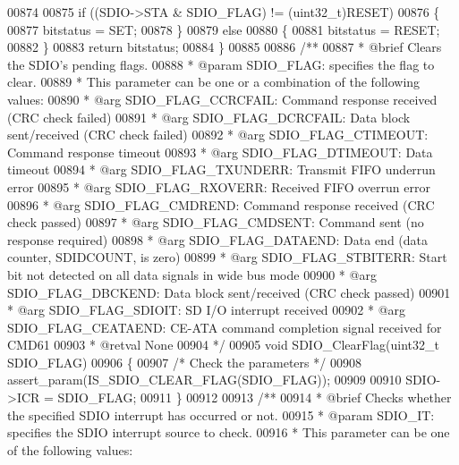 \begin{DoxyCode}
00874 
00875   \textcolor{keywordflow}{if} ((SDIO->STA & SDIO\_FLAG) != (uint32\_t)RESET)
00876   \{
00877     bitstatus = SET;
00878   \}
00879   \textcolor{keywordflow}{else}
00880   \{
00881     bitstatus = RESET;
00882   \}
00883   \textcolor{keywordflow}{return} bitstatus;
00884 \}
00885 
00886 \textcolor{comment}{/**}
00887 \textcolor{comment}{  * @brief  Clears the SDIO's pending flags.}
00888 \textcolor{comment}{  * @param  SDIO\_FLAG: specifies the flag to clear.  }
00889 \textcolor{comment}{  *          This parameter can be one or a combination of the following values:}
00890 \textcolor{comment}{  *            @arg SDIO\_FLAG\_CCRCFAIL: Command response received (CRC check failed)}
00891 \textcolor{comment}{  *            @arg SDIO\_FLAG\_DCRCFAIL: Data block sent/received (CRC check failed)}
00892 \textcolor{comment}{  *            @arg SDIO\_FLAG\_CTIMEOUT: Command response timeout}
00893 \textcolor{comment}{  *            @arg SDIO\_FLAG\_DTIMEOUT: Data timeout}
00894 \textcolor{comment}{  *            @arg SDIO\_FLAG\_TXUNDERR: Transmit FIFO underrun error}
00895 \textcolor{comment}{  *            @arg SDIO\_FLAG\_RXOVERR:  Received FIFO overrun error}
00896 \textcolor{comment}{  *            @arg SDIO\_FLAG\_CMDREND:  Command response received (CRC check passed)}
00897 \textcolor{comment}{  *            @arg SDIO\_FLAG\_CMDSENT:  Command sent (no response required)}
00898 \textcolor{comment}{  *            @arg SDIO\_FLAG\_DATAEND:  Data end (data counter, SDIDCOUNT, is zero)}
00899 \textcolor{comment}{  *            @arg SDIO\_FLAG\_STBITERR: Start bit not detected on all data signals in wide bus mode}
00900 \textcolor{comment}{  *            @arg SDIO\_FLAG\_DBCKEND:  Data block sent/received (CRC check passed)}
00901 \textcolor{comment}{  *            @arg SDIO\_FLAG\_SDIOIT:   SD I/O interrupt received}
00902 \textcolor{comment}{  *            @arg SDIO\_FLAG\_CEATAEND: CE-ATA command completion signal received for CMD61}
00903 \textcolor{comment}{  * @retval None}
00904 \textcolor{comment}{  */}
00905 \textcolor{keywordtype}{void} SDIO_ClearFlag(uint32\_t SDIO\_FLAG)
00906 \{
00907   \textcolor{comment}{/* Check the parameters */}
00908   assert_param(IS\_SDIO\_CLEAR\_FLAG(SDIO\_FLAG));
00909 
00910   SDIO->ICR = SDIO\_FLAG;
00911 \}
00912 
00913 \textcolor{comment}{/**}
00914 \textcolor{comment}{  * @brief  Checks whether the specified SDIO interrupt has occurred or not.}
00915 \textcolor{comment}{  * @param  SDIO\_IT: specifies the SDIO interrupt source to check. }
00916 \textcolor{comment}{  *          This parameter can be one of the following values:}

\end{DoxyCode}
